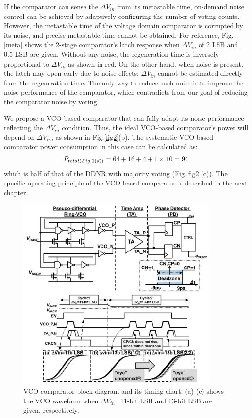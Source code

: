 \documentclass[journal]{IEEEtran}
\begin{document}
If the comparator can sense the $\Delta V_{in}$ from its metastable time, on-demand noise control can be achieved by adaptively configuring the number of voting counts.
However, the metastable time of the voltage domain comparator is corrupted by its noise, and precise metastable time cannot be obtained. For reference, Fig.\ref{meta} shows the 2-stage comparator's latch response when $\Delta V_{in}$ of 2 LSB and 0.5 LSB are given. Without any noise, the regeneration time is inversely proportional to $\Delta V_{in}$ as shown in red. On the other hand, when noise is present, the latch may open early due to noise effects; $\Delta V_{in}$ cannot be estimated directly from the regeneration time. The only way to reduce such noise is to improve the noise performance of the comparator, which contradicts from our goal of reducing the comparator noise by voting.

We propose a VCO-based comparator that can fully adapt its noise performance reflecting the $\Delta V_{in}$ condition. Thus, the ideal VCO-based comparator's power will depend on $\Delta V_{in}$, as shown in Fig.\ref{fig2}(b). The systematic VCO-based comparator power consumption in this case can be calculated as:
\begin{eqnarray}
    \centering
    P_{total(Fig.1(d))} = 64+16+4+1\times 10=94
    \label{ddnr}
\end{eqnarray}
which is half of that of the DDNR with majority voting (Fig.\ref{fig2}(c)). 
The specific operating principle of the VCO-based comparator is described in the next chapter.


\begin{figure}[!]
\centering
 \includegraphics[width=0.9\textwidth]{figs/fig4.png}
  \caption{VCO comparator block diagram and its timing chart. (a)-(c) shows the VCO waveform when $\Delta V_{in}$=11-bit LSB and 13-bit LSB are given, respectively.}
  \label{schema}
\end{figure}
\end{document}
